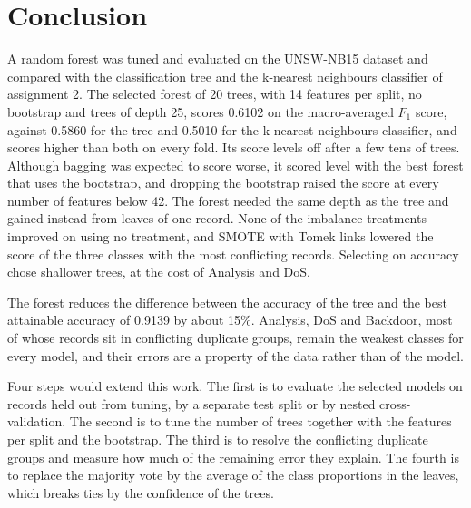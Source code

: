\documentclass[conference,10pt]{IEEEtran}
\begin{document}
\section{Conclusion}
\label{sec:conclusion}

A random forest was tuned and evaluated on the UNSW-NB15 dataset and
compared with the classification tree and the k-nearest neighbours
classifier of assignment 2. The selected forest of 20 trees, with 14
features per split, no bootstrap and trees of depth 25, scores 0.6102 on
the macro-averaged $F_1$ score, against 0.5860 for the tree and 0.5010 for
the k-nearest neighbours classifier, and scores higher than both on every fold.
Its score levels off after a few tens of trees. Although bagging was
expected to score worse, it scored level with the best forest that uses the
bootstrap, and dropping the bootstrap raised the score at every number of
features below 42. The forest needed the same depth as the tree and gained
instead from leaves of one record. None of the imbalance treatments
improved on using no treatment, and SMOTE with Tomek links lowered the
score of the three classes with the most conflicting records. Selecting on
accuracy chose shallower trees, at the cost of Analysis and DoS.

 The forest reduces the difference between the accuracy of the tree and the
best attainable accuracy of 0.9139 by about 15\%. Analysis, DoS and
Backdoor, most of whose records sit in conflicting duplicate groups, remain
the weakest classes for every model, and their errors are a property of the
data rather than of the model.

Four steps would extend this work. The first is to evaluate the selected
models on records held out from tuning, by a separate test split or by
nested cross-validation. The second is to tune the number of trees together
with the features per split and the bootstrap. The third is to resolve the
conflicting duplicate groups and measure how much of the remaining error
they explain. The fourth is to replace the majority vote by the average of
the class proportions in the leaves, which breaks ties by the confidence of
the trees.



\end{document}
